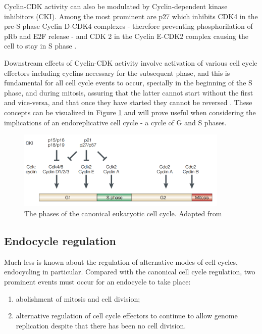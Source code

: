 \documentclass[11pt,twoside,a4paper]{report}
\begin{document}
				Cyclin-CDK activity can also be modulated by Cyclin-dependent kinase inhibitors (CKI). Among the most prominent are p27 which inhibits CDK4 in the pre-S phase Cyclin D-CDK4 complexes - therefore preventing phosphorilation of pRb and E2F release - and CDK 2 in the Cyclin E-CDK2 complex causing the cell to stay in S phase \cite{Besson2008}.
				
				Downstream effects of Cyclin-CDK activity involve activation of various cell cycle effectors including cyclins necessary for the subsequent phase, and this is fundamental for all cell cycle events to occur, specially in the beginning of the S phase, and during mitosis, assuring that the latter cannot start without the first and vice-versa, and that once they have started they cannot be reversed \cite{Trimarchi2002}. These concepts can be visualized in Figure \ref{fig:canonical_cycle} and will prove useful when considering the implications of an endoreplicative cell cycle - a cycle of G and S phases.
				
				\begin{figure}[here]
					\centering
					\includegraphics[width=0.9\textwidth]{pngs/canonical_cell_cycle.png}
					\caption[The phases of the canonical eukaryotic cell cycle]
					{The phases of the canonical eukaryotic cell cycle. {\footnotesize Adapted from \cite{Trimarchi2002}}}
					\label{fig:canonical_cycle}
				\end{figure}

			\subsection{Endocycle regulation}
			\label{subsection:endocycles}
			Much less is known about the regulation of alternative modes of cell cycles, endocycling in particular. Compared with the canonical cell cycle regulation, two prominent events must occur for an endocycle to take place:
			
			\begin{enumerate}
				\item abolishment of mitosis and cell division;
				\item alternative regulation of cell cycle effectors to continue to allow genome replication despite that there has been no cell division.
			\end{enumerate}
						
\end{document}
